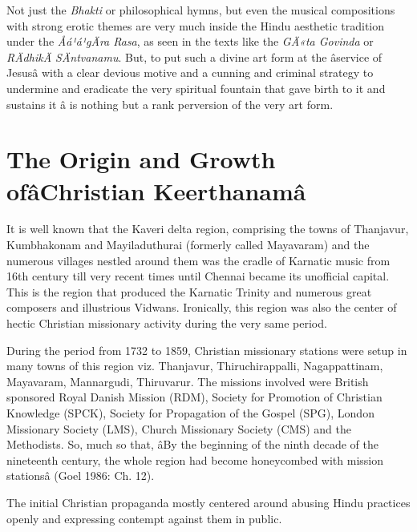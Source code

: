 Not just the \textit{Bhakti} or philosophical hymns, but even the musical compositions with strong erotic themes are very much inside the Hindu aesthetic tradition under the \textit{Åá¹á¹gÄra Rasa}, as seen in the texts like the \textit{GÄ«ta Govinda} or \textit{RÄdhikÄ SÄntvanamu}. But, to put such a divine art form at the âservice of Jesusâ with a clear devious motive and a cunning and criminal strategy to undermine and eradicate the very spiritual fountain that gave birth to it and sustains it â is nothing but a rank perversion of the very art form.

\vspace{-.3cm}

\section*{The Origin and Growth of\hfill \break âChristian Keerthanamâ}

It is well known that the Kaveri delta region, comprising the towns of Thanjavur, Kumbhakonam and Mayiladuthurai (formerly called Mayavaram) and the numerous villages nestled around them was the cradle of Karnatic music from 16th century till very recent times until Chennai became its unofficial capital. This is the region that produced the Karnatic Trinity and numerous great composers and illustrious Vidwans. Ironically, this region was also the center of hectic Christian missionary activity during the very same period.

During the period from 1732 to 1859, Christian missionary stations were setup in many towns of this region viz. Thanjavur, Thiruchirappalli, Nagappattinam, Mayavaram, Mannargudi, Thiruvarur. The missions involved were British sponsored Royal Danish Mission (RDM), Society for Promotion of Christian Knowledge (SPCK), Society for Propagation of the Gospel (SPG), London Missionary Society (LMS), Church Missionary Society (CMS) and the Methodists. So, much so that, âBy the beginning of the ninth decade of the nineteenth century, the whole region had become honeycombed with mission stationsâ (Goel 1986: Ch. 12).

The initial Christian propaganda mostly centered around abusing Hindu practices openly and expressing contempt against them in public.

